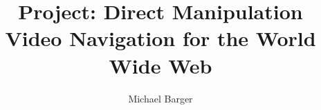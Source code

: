 \documentclass{report}
\begin{document}
\title{Project: Direct Manipulation Video Navigation for the World Wide Web}
\author{Michael Barger}
\maketitle

\tableofcontents






\end{document}

